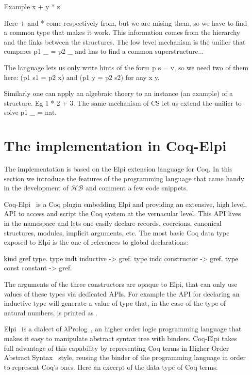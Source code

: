 \documentclass[a4paper,UKenglish,cleveref, autoref]{lipics-v2019}
\newcommand{\HB}{\ensuremath{\mathcal{HB}}}
\theoremstyle{implem}
\theoremstyle{implem}
\theoremstyle{command}
\begin{document}
Example x + y * z

Here + and * come respectively from, but we are mising them, so we have
to find a common type that makes it work. This information comes from
the hierarchy and the links between the structures. The low level mechanism
is the unifier that compares p1 \_ = p2 \_ and has to find a common
superstructure...

The language lets us only write hints of the form p s = v, so we need two
of them here: (p1 s1 = p2 x) and (p1 y = p2 s2) for any x y.

Similarly one can apply an algebraic thoery to an instance (an example)
of a structure. Eg 1 * 2 + 3. The same mechanism of CS let us
extend the unifier to solve p1 \_ = nat.


\section{The implementation in Coq-Elpi}\label{sec:implementation}

The implementation is based on the Elpi
extension language for Coq. In this section we introduce the features of the
programming language that came handy in the development of \HB{} and
comment a few code snippets.

Coq-Elpi~\cite{CoqElpi} is a Coq plugin embedding
Elpi and providing an
extensive, high level, API to access and script the Coq system at the
vernacular level.
This API lives in the  namespace and lets one easily declare
records, coercions, canonical structures, modules, implicit arguments, etc.
The most basic Coq data type exposed to Elpi is the one of references to global
declarations:

\begin{elpicode}
kind gref  type.                 %
type indt  inductive -> gref.    %
type indc  constructor -> gref.  %
type const constant -> gref.     %
\end{elpicode}

The arguments of the three constructors are opaque to Elpi, that can only use
values of these types via dedicated APIs. For example the API for declaring
an inductive type will generate a value of type  that,
in the case of the type of natural numbers, is printed as .

Elpi~\cite{DBLP:conf/lpar/DunchevGCT15} is a dialect
of $\lambda$Prolog~\cite{Miller:2012:PHL:2331097}, an higher order
logic programming language that makes it easy to manipulate abstract syntax
tree with binders. Coq-Elpi takes full advantage of this capability by
representing Coq terms in Higher Order Abstract
Syntax~\cite{10.1145/53990.54010} style, reusing the binder of the programming
language in order to represent Coq's ones. Here an excerpt of the data
type of Coq terms:
\end{document}
